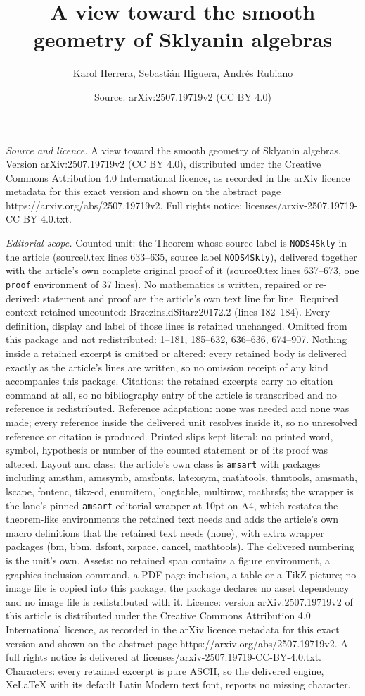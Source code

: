 \documentclass[10pt,a4paper]{amsart}
\title[A view toward the smooth geometry of Sklyanin algebras]{A view toward the smooth geometry of Sklyanin algebras}
\author{Karol Herrera, Sebasti\'an Higuera, Andr\'es Rubiano}
\date{Source: arXiv:2507.19719v2 (CC BY 4.0)}
\begin{document}
\maketitle

\noindent\emph{Source and licence.} A view toward the smooth geometry of Sklyanin algebras. Version arXiv:2507.19719v2 (CC BY 4.0), distributed under the Creative Commons Attribution 4.0 International licence, as recorded in the arXiv licence metadata for this exact version and shown on the abstract page https://arxiv.org/abs/2507.19719v2. Full rights notice: licenses/arxiv-2507.19719-CC-BY-4.0.txt.\par\smallskip

\noindent\textit{Editorial scope.} Counted unit: the Theorem whose source label is \texttt{NODS4Skly} in the article (source0.tex lines 633--635, source label \texttt{NODS4Skly}), delivered together with the article's own complete original proof of it (source0.tex lines 637--673, one \texttt{proof} environment of 37 lines). No mathematics is written, repaired or re-derived: statement and proof are the article's own text line for line. Required context retained uncounted: BrzezinskiSitarz20172.2 (lines 182--184). Every definition, display and label of those lines is retained unchanged. Omitted from this package and not redistributed: 1--181, 185--632, 636--636, 674--907. Nothing inside a retained excerpt is omitted or altered: every retained body is delivered exactly as the article's lines are written, so no omission receipt of any kind accompanies this package. Citations: the retained excerpts carry no citation command at all, so no bibliography entry of the article is transcribed and no reference is redistributed. Reference adaptation: none was needed and none was made; every reference inside the delivered unit resolves inside it, so no unresolved reference or citation is produced. Printed slips kept literal: no printed word, symbol, hypothesis or number of the counted statement or of its proof was altered. Layout and class: the article's own class is \texttt{amsart} with packages including amsthm, amssymb, amsfonts, latexsym, mathtools, thmtools, amsmath, lscape, fontenc, tikz-cd, enumitem, longtable, multirow, mathrsfs; the wrapper is the lane's pinned \texttt{amsart} editorial wrapper at 10pt on A4, which restates the theorem-like environments the retained text needs and adds the article's own macro definitions that the retained text needs (none), with extra wrapper packages (bm, bbm, dsfont, xspace, cancel, mathtools). The delivered numbering is the unit's own. Assets: no retained span contains a figure environment, a graphics-inclusion command, a PDF-page inclusion, a table or a TikZ picture; no image file is copied into this package, the package declares no asset dependency and no image file is redistributed with it. Licence: version arXiv:2507.19719v2 of this article is distributed under the Creative Commons Attribution 4.0 International licence, as recorded in the arXiv licence metadata for this exact version and shown on the abstract page https://arxiv.org/abs/2507.19719v2. A full rights notice is delivered at licenses/arxiv-2507.19719-CC-BY-4.0.txt. Characters: every retained excerpt is pure ASCII, so the delivered engine, XeLaTeX with its default Latin Modern text font, reports no missing character.
\end{document}
